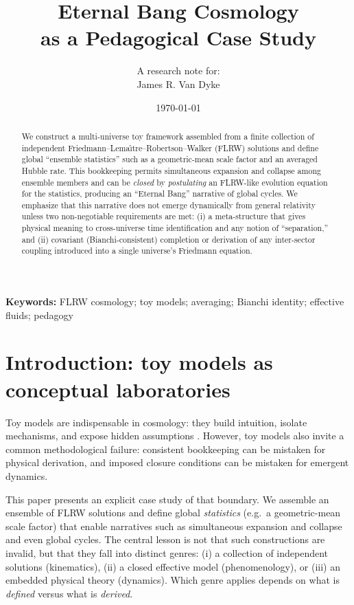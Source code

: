 \documentclass[11pt]{article}
\title{Eternal Bang Cosmology \\ as a Pedagogical Case Study}
\author{A research note for: \\ James R. Van Dyke}
\date{\today}
\begin{document}
\maketitle

\begin{abstract}
We construct a multi-universe toy framework assembled from a finite collection of independent Friedmann--Lema\^{\i}tre--Robertson--Walker (FLRW) solutions and define global ``ensemble statistics'' such as a geometric-mean scale factor and an averaged Hubble rate. This bookkeeping permits simultaneous expansion and collapse among ensemble members and can be \emph{closed} by \emph{postulating} an FLRW-like evolution equation for the statistics, producing an ``Eternal Bang'' narrative of global cycles. We emphasize that this narrative does not emerge dynamically from general relativity unless two non-negotiable requirements are met: (i) a meta-structure that gives physical meaning to cross-universe time identification and any notion of ``separation,'' and (ii) covariant (Bianchi-consistent) completion or derivation of any inter-sector coupling introduced into a single universe's Friedmann equation.
\end{abstract}

\noindent\textbf{Keywords:} FLRW cosmology; toy models; averaging; Bianchi identity; effective fluids; pedagogy

\section{Introduction: toy models as conceptual laboratories}

Toy models are indispensable in cosmology: they build intuition, isolate mechanisms, and expose hidden assumptions \citep{Weinberg2008,Mukhanov2005,Dodelson2003}.
However, toy models also invite a common methodological failure: consistent bookkeeping can be mistaken for physical derivation, and imposed closure conditions can be mistaken for emergent dynamics.

This paper presents an explicit case study of that boundary. We assemble an ensemble of FLRW solutions and define global \emph{statistics} (e.g.\ a geometric-mean scale factor) that enable narratives such as simultaneous expansion and collapse and even global cycles. The central lesson is not that such constructions are invalid, but that they fall into distinct genres:
(i) a collection of independent solutions (kinematics),
(ii) a closed effective model (phenomenology),
or (iii) an embedded physical theory (dynamics).
Which genre applies depends on what is \emph{defined} versus what is \emph{derived}.
\end{document}
